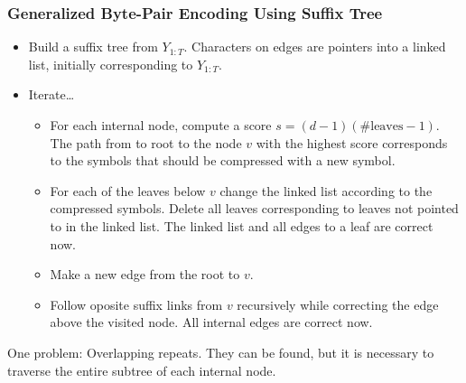 \documentclass[english,notes]{beamer}
\begin{document}
\begin{frame}
  \frametitle{Generalized Byte-Pair Encoding Using Suffix Tree}
  \begin{itemize}
  \item Build a suffix tree from $Y_{1:T}$. Characters on edges are pointers
    into a linked list, initially corresponding to $Y_{1:T}$.
  \item Iterate\dots
    \begin{itemize}
    \item For each internal node, compute a score
      $s = (d - 1)(\text{\#leaves} - 1)$. The path from to root to the node
      $v$ with the highest score corresponds to the symbols that should be
      compressed with a new symbol.
    \item For each of the leaves below $v$ change the linked list according to
      the compressed symbols. Delete all leaves corresponding to leaves not
      pointed to in the linked list. The linked list and all edges to a leaf
      are correct now.
    \item Make a new edge from the root to $v$.
    \item Follow oposite suffix links from $v$ recursively while correcting
      the edge above the visited node. All internal edges are correct now.
    \end{itemize}
  \end{itemize}
  One problem: Overlapping repeats. They can be found, but it is necessary to
  traverse the entire subtree of each internal node.
\end{frame}
\end{document}
